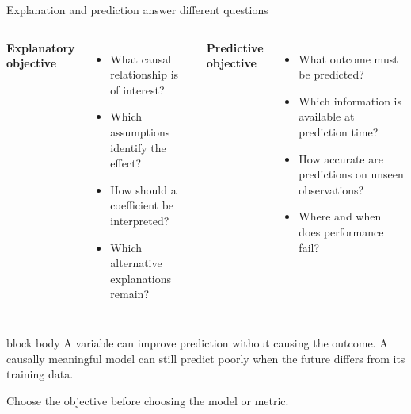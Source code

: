 \documentclass[10pt,aspectratio=169]{beamer}
\begin{document}
\begin{frame}{Explanation and prediction answer different questions}

\small

\begin{columns}[T]


\textbf{Explanatory objective}

\begin{itemize}
  \item What causal relationship is of interest?
  \item Which assumptions identify the effect?
  \item How should a coefficient be interpreted?
  \item Which alternative explanations remain?
\end{itemize}


\textbf{Predictive objective}

\begin{itemize}
  \item What outcome must be predicted?
  \item Which information is available at prediction time?
  \item How accurate are predictions on unseen observations?
  \item Where and when does performance fail?
\end{itemize}

\end{columns}

\vspace{0.35cm}

\begin{beamercolorbox}[rounded=true,sep=8pt]{block body}
A variable can improve prediction without causing the outcome. A causally meaningful model can still predict poorly when the future differs from its training data.
\end{beamercolorbox}

\vspace{0.15cm}

\centering
\textcolor{ukudlaRed}{Choose the objective before choosing the model or metric.}

\end{frame}
\end{document}
